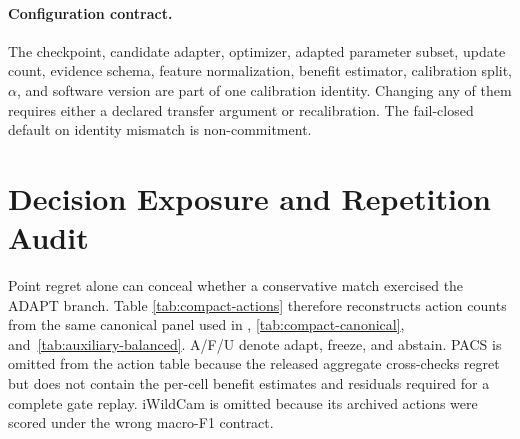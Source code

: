 \paragraph{Configuration contract.}
The checkpoint, candidate adapter, optimizer, adapted parameter subset, update count, evidence
schema, feature normalization, benefit estimator, calibration split, $\alpha$, and software version
are part of one calibration identity. Changing any of them requires either a declared transfer
argument or recalibration. The fail-closed default on identity mismatch is non-commitment.

\section{Decision Exposure and Repetition Audit}
\label{app:compact-actions}

Point regret alone can conceal whether a conservative match exercised the ADAPT branch. Table
\ref{tab:compact-actions} therefore reconstructs action counts from the same canonical panel used
in , \ref{tab:compact-canonical}, and~\ref{tab:auxiliary-balanced}.
A/F/U denote adapt, freeze, and abstain. PACS is omitted from
the action table because the released aggregate cross-checks regret but does not contain the
per-cell benefit estimates and residuals required for a complete gate replay. iWildCam is omitted
because its archived actions were scored under the wrong macro-F1 contract.


